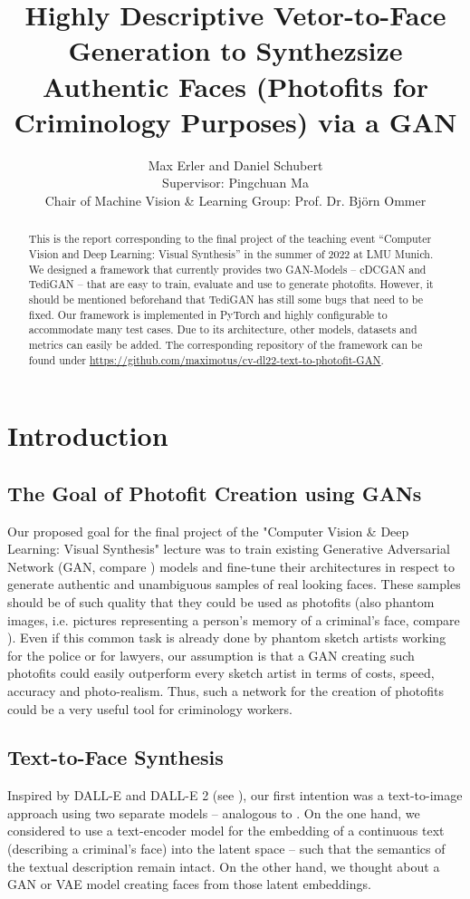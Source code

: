 \documentclass[12pt, a4paper]{article}
\title{Highly Descriptive Vetor-to-Face Generation to Synthezsize Authentic Faces (Photofits for Criminology Purposes) via a GAN}
\author{Max Erler and Daniel Schubert\\
Supervisor: Pingchuan Ma\\
Chair of Machine Vision \& Learning Group: Prof. Dr. Björn Ommer}
\begin{document}
\maketitle
\begin{abstract}
    This is the report corresponding to the final project of the teaching event ``Computer Vision and Deep Learning: Visual Synthesis'' in the summer of 2022 at LMU Munich.
    We designed a framework that currently provides two GAN-Models -- cDCGAN and TediGAN -- that are easy to train, evaluate and use to generate photofits.
    However, it should be mentioned beforehand that TediGAN has still some bugs that need to be fixed.
    Our framework is implemented in PyTorch and highly configurable to accommodate many test cases.
    Due to its architecture, other models, datasets and metrics can easily be added.
    The corresponding repository of the framework can be found under
    \href{https://github.com/maximotus/cv-dl22-text-to-photofit-GAN}{https://github.com/maximotus/cv-dl22-text-to-photofit-GAN}.
    \end{abstract}
\pagebreak
\tableofcontents
\pagebreak
\section{Introduction}
\subsection{The Goal of Photofit Creation using GANs}
\label{goal}
Our proposed goal for the final project of the "Computer Vision \& Deep Learning: Visual Synthesis" lecture was to train 
existing Generative Adversarial Network (GAN, compare \cite{gan}) models and fine-tune their architectures in respect to generate authentic
and unambiguous samples of real looking faces. These samples should be of such quality that they could be used as
photofits (also phantom images, i.e. pictures representing a person's memory of a criminal's face, compare \cite{photofitDef}).
Even if this common task is already done by phantom sketch artists working for the police or for lawyers, our assumption
is that a GAN creating such photofits could easily outperform every sketch artist in terms of costs, speed, accuracy and photo-realism.
Thus, such a network for the creation of photofits could be a very useful tool for criminology workers.

\subsection{Text-to-Face Synthesis}
Inspired by DALL-E and DALL-E 2 (see \cite{dallE}), our first intention was a text-to-image approach
using two separate models -- analogous to \cite{Xia_2021_CVPR}. On the one hand, we considered to
use a text-encoder model for the embedding of a continuous text (describing a criminal's face) into the latent space --
such that the semantics of the textual description remain intact. On the other hand, we thought about a GAN or VAE model
creating faces from those latent embeddings.
\end{document}
